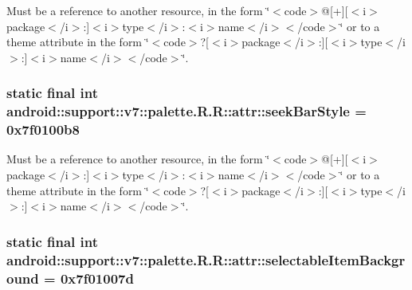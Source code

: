 Must be a reference to another resource, in the form \char`\"{}$<$code$>$@\mbox{[}+\mbox{]}\mbox{[}$<$i$>$package$<$/i$>$:\mbox{]}$<$i$>$type$<$/i$>$:$<$i$>$name$<$/i$>$$<$/code$>$\char`\"{} or to a theme attribute in the form \char`\"{}$<$code$>$?\mbox{[}$<$i$>$package$<$/i$>$:\mbox{]}\mbox{[}$<$i$>$type$<$/i$>$:\mbox{]}$<$i$>$name$<$/i$>$$<$/code$>$\char`\"{}. \hypertarget{classandroid_1_1support_1_1v7_1_1palette_1_1_r_1_1attr_096d898093a4821257a4ab0c63b4bd77}{
\subsubsection[{seekBarStyle}]{\setlength{\rightskip}{0pt plus 5cm}static final int android::support::v7::palette.R.R::attr::seekBarStyle = 0x7f0100b8}}
\label{classandroid_1_1support_1_1v7_1_1palette_1_1_r_1_1attr_096d898093a4821257a4ab0c63b4bd77}


Must be a reference to another resource, in the form \char`\"{}$<$code$>$@\mbox{[}+\mbox{]}\mbox{[}$<$i$>$package$<$/i$>$:\mbox{]}$<$i$>$type$<$/i$>$:$<$i$>$name$<$/i$>$$<$/code$>$\char`\"{} or to a theme attribute in the form \char`\"{}$<$code$>$?\mbox{[}$<$i$>$package$<$/i$>$:\mbox{]}\mbox{[}$<$i$>$type$<$/i$>$:\mbox{]}$<$i$>$name$<$/i$>$$<$/code$>$\char`\"{}. \hypertarget{classandroid_1_1support_1_1v7_1_1palette_1_1_r_1_1attr_2152a95ffa6aa13a1f78ca77517b566f}{
\subsubsection[{selectableItemBackground}]{\setlength{\rightskip}{0pt plus 5cm}static final int android::support::v7::palette.R.R::attr::selectableItemBackground = 0x7f01007d}}
\label{classandroid_1_1support_1_1v7_1_1palette_1_1_r_1_1attr_2152a95ffa6aa13a1f78ca77517b566f}


